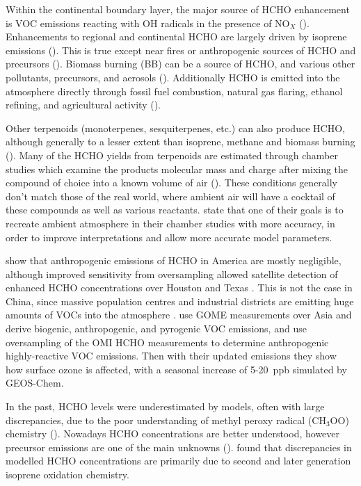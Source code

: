     Within the continental boundary layer, the major source of HCHO enhancement is VOC emissions reacting with OH radicals in the presence of NO$_X$ (\cite{Wagner2002, Millet2006, Kefauver2014}).
    Enhancements to regional and continental HCHO are largely driven by isoprene emissions (\cite{Guenther1995, Palmer2003, Shim2005, Kefauver2014}).
    This is true except near fires or anthropogenic sources of HCHO and precursors (\cite{Guenther1995, Kefauver2014, Wolfe2016}).
    Biomass burning (BB) can be a source of HCHO, and various other pollutants, precursors, and aerosols (\cite{Guenther1995, Andreae2001}).
    Additionally HCHO is emitted into the atmosphere directly through fossil fuel combustion, natural gas flaring, ethanol refining, and agricultural activity (\cite{Wolfe2016}).
    
    Other terpenoids (monoterpenes, sesquiterpenes, etc.) can also produce HCHO, although generally to a lesser extent than isoprene, methane and biomass burning (\cite{Guenther2012}).
    Many of the HCHO yields from terpenoids are estimated through chamber studies which examine the products molecular mass and charge after mixing the compound of choice into a known volume of air (\cite[eg.]{Nguyen2014}).
    These conditions generally don't match those of the real world, where ambient air will have a cocktail of these compounds as well as various reactants.
    \cite{Nguyen2014} state that one of their goals is to recreate ambient atmosphere in their chamber studies with more accuracy, in order to improve interpretations and allow more accurate model parameters.
    
    \cite{Millet2008} show that anthropogenic emissions of HCHO in America are mostly negligible, although improved sensitivity from oversampling allowed satellite detection of enhanced HCHO concentrations over Houston and Texas \citep{Zhu2014}.
    This is not the case in China, since massive population centres and industrial districts are emitting huge amounts of VOCs into the atmosphere \citep{Fu2007}.
    \cite{Fu2007} use GOME measurements over Asia and derive biogenic, anthropogenic, and pyrogenic VOC emissions, and \cite{Zhu2014} use oversampling of the OMI HCHO measurements to determine anthropogenic highly-reactive VOC emissions.
    Then with their updated emissions they show how surface ozone is affected, with a seasonal increase of 5-20~ppb simulated by GEOS-Chem.
    
    In the past, HCHO levels were underestimated by models, often with large discrepancies, due to the poor understanding of methyl peroxy radical (CH$_3$OO) chemistry (\cite{Wagner2002}).
    Nowadays HCHO concentrations are better understood, however precursor emissions are one of the main unknowns (\cite[eg.]{Emmerson2016,Marvin2017}).
    \cite{Marvin2017} found that discrepancies in modelled HCHO concentrations are primarily due to second and later generation isoprene oxidation chemistry.
    
